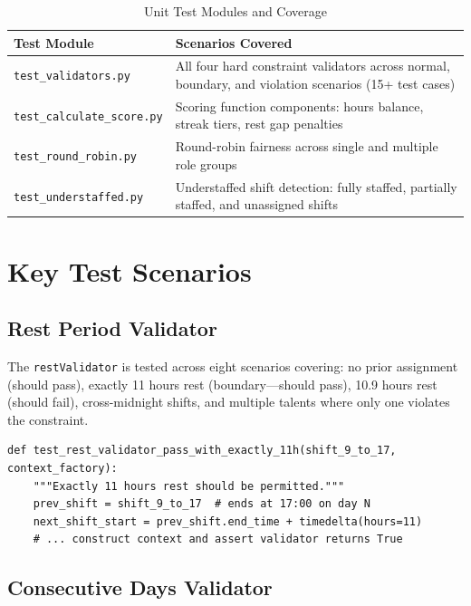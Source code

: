 \begin{table}[H]
\centering
\caption{Unit Test Modules and Coverage}
\label{tab:tests}
\begin{tabular}{p{5cm} p{8cm}}
\toprule
\textbf{Test Module} & \textbf{Scenarios Covered} \\
\midrule
\texttt{test\_validators.py} & All four hard constraint validators across normal, boundary, and violation scenarios (15+ test cases) \\
\texttt{test\_calculate\_score.py} & Scoring function components: hours balance, streak tiers, rest gap penalties \\
\texttt{test\_round\_robin.py} & Round-robin fairness across single and multiple role groups \\
\texttt{test\_understaffed.py} & Understaffed shift detection: fully staffed, partially staffed, and unassigned shifts \\
\bottomrule
\end{tabular}
\end{table}

\section{Key Test Scenarios}

\subsection{Rest Period Validator}

The \texttt{restValidator} is tested across eight scenarios covering: no prior assignment (should pass), exactly 11 hours rest (boundary—should pass), 10.9 hours rest (should fail), cross-midnight shifts, and multiple talents where only one violates the constraint.

\begin{lstlisting}[caption={Example rest validator test}, label={lst:test_rest}]
def test_rest_validator_pass_with_exactly_11h(shift_9_to_17, context_factory):
    """Exactly 11 hours rest should be permitted."""
    prev_shift = shift_9_to_17  # ends at 17:00 on day N
    next_shift_start = prev_shift.end_time + timedelta(hours=11)
    # ... construct context and assert validator returns True
\end{lstlisting}

\subsection{Consecutive Days Validator}


